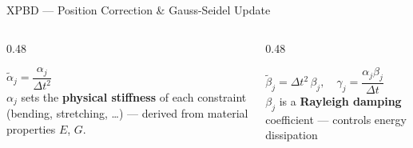 \documentclass[aspectratio=169]{beamer}
\begin{document}
\begin{frame}{XPBD — Position Correction \& Gauss-Seidel Update}
  \vspace{0.4em}
  \begin{columns}[T]
    \begin{column}{0.48\textwidth}
      \begin{tcolorbox}[colback=compgreen!15, colframe=compgreen,
                        title={Compliance $\tilde{\alpha}_j$},
                        fonttitle=\bfseries, coltitle=white,
                        arc=4pt, boxrule=1pt]
        \small
        $\tilde{\alpha}_j = \dfrac{\alpha_j}{\Delta t^2}$\\[4pt]
        $\alpha_j$ sets the \textbf{physical stiffness} of each constraint
        (bending, stretching, \ldots) — derived from material properties $E$, $G$.
      \end{tcolorbox}
    \end{column}
    \begin{column}{0.48\textwidth}
      \begin{tcolorbox}[colback=damporange!15, colframe=damporange,
                        title={Damping $\gamma_j$},
                        fonttitle=\bfseries, coltitle=white,
                        arc=4pt, boxrule=1pt]
        \small
        $\tilde{\beta}_j = \Delta t^2\,\beta_j,\quad
         \gamma_j = \dfrac{\alpha_j\beta_j}{\Delta t}$\\[4pt]
        $\beta_j$ is a \textbf{Rayleigh damping} coefficient — controls energy dissipation
      \end{tcolorbox}
    \end{column}
  \end{columns}

\end{frame}
\end{document}
